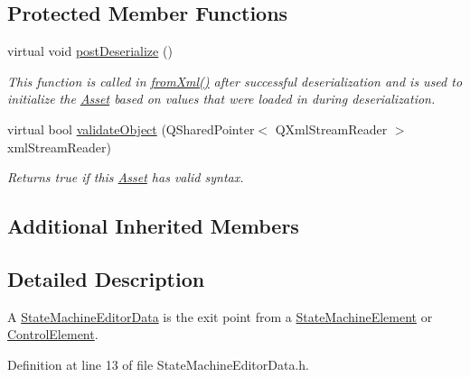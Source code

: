 \subsection*{Protected Member Functions}
\begin{DoxyCompactItemize}
\item 
virtual void \hyperlink{class_picto_1_1_state_machine_editor_data_af001fdfd8af85db7e351d2625252bded}{post\-Deserialize} ()
\begin{DoxyCompactList}\small\item\em This function is called in \hyperlink{class_picto_1_1_asset_a8bed4da09ecb1c07ce0dab313a9aba67}{from\-Xml()} after successful deserialization and is used to initialize the \hyperlink{class_picto_1_1_asset}{Asset} based on values that were loaded in during deserialization. \end{DoxyCompactList}\item 
virtual bool \hyperlink{class_picto_1_1_state_machine_editor_data_ace4e1b873c7606f6b771daf57e1ee132}{validate\-Object} (Q\-Shared\-Pointer$<$ Q\-Xml\-Stream\-Reader $>$ xml\-Stream\-Reader)
\begin{DoxyCompactList}\small\item\em Returns true if this \hyperlink{class_picto_1_1_asset}{Asset} has valid syntax. \end{DoxyCompactList}\end{DoxyCompactItemize}
\subsection*{Additional Inherited Members}


\subsection{Detailed Description}
A \hyperlink{class_picto_1_1_state_machine_editor_data}{State\-Machine\-Editor\-Data} is the exit point from a \hyperlink{class_picto_1_1_state_machine_element}{State\-Machine\-Element} or \hyperlink{class_picto_1_1_control_element}{Control\-Element}. 



Definition at line 13 of file State\-Machine\-Editor\-Data.\-h.



